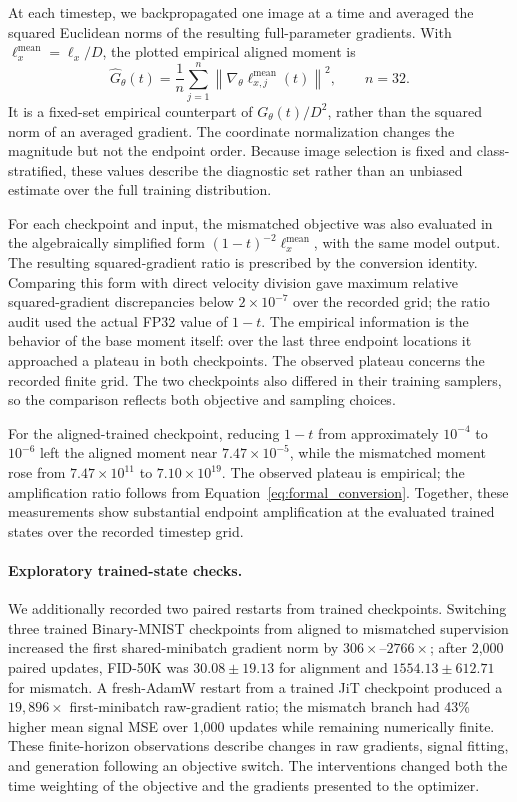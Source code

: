 \documentclass{article}
\theoremstyle{plain}
\theoremstyle{definition}
\theoremstyle{remark}
\newcommand{\norm}[1]{\left\lVert #1\right\rVert}
\begin{document}
At each timestep, we backpropagated one image at a time and averaged the squared Euclidean norms of the resulting full-parameter gradients. With $\ell_x^{\mathrm{mean}}=\ell_x/D$, the plotted empirical aligned moment is
\begin{equation}
\widehat G_\theta(t)=\frac{1}{n}\sum_{j=1}^n
\norm{\nabla_\theta\ell_{x,j}^{\mathrm{mean}}(t)}^2,
\qquad n=32.
\end{equation}
It is a fixed-set empirical counterpart of $G_\theta(t)/D^2$, rather than the squared norm of an averaged gradient. The coordinate normalization changes the magnitude but not the endpoint order. Because image selection is fixed and class-stratified, these values describe the diagnostic set rather than an unbiased estimate over the full training distribution.

For each checkpoint and input, the mismatched objective was also evaluated in the algebraically simplified form $(1-t)^{-2}\ell_x^{\mathrm{mean}}$, with the same model output. The resulting squared-gradient ratio is prescribed by the conversion identity. Comparing this form with direct velocity division gave maximum relative squared-gradient discrepancies below $2\times10^{-7}$ over the recorded grid; the ratio audit used the actual FP32 value of $1-t$. The empirical information is the behavior of the base moment itself: over the last three endpoint locations it approached a plateau in both checkpoints. The observed plateau concerns the recorded finite grid. The two checkpoints also differed in their training samplers, so the comparison reflects both objective and sampling choices.

For the aligned-trained checkpoint, reducing $1-t$ from approximately $10^{-4}$ to $10^{-6}$ left the aligned moment near $7.47\times10^{-5}$, while the mismatched moment rose from $7.47\times10^{11}$ to $7.10\times10^{19}$. The observed plateau is empirical; the amplification ratio follows from Equation~\eqref{eq:formal_conversion}. Together, these measurements show substantial endpoint amplification at the evaluated trained states over the recorded timestep grid.

\paragraph{Exploratory trained-state checks.}
We additionally recorded two paired restarts from trained checkpoints. Switching three trained Binary-MNIST checkpoints from aligned to mismatched supervision increased the first shared-minibatch gradient norm by $306\times$--$2766\times$; after 2,000 paired updates, FID-50K was $30.08\pm19.13$ for alignment and $1554.13\pm612.71$ for mismatch. A fresh-AdamW restart from a trained JiT checkpoint produced a $19{,}896\times$ first-minibatch raw-gradient ratio; the mismatch branch had 43\% higher mean signal MSE over 1,000 updates while remaining numerically finite. These finite-horizon observations describe changes in raw gradients, signal fitting, and generation following an objective switch. The interventions changed both the time weighting of the objective and the gradients presented to the optimizer.
\end{document}
